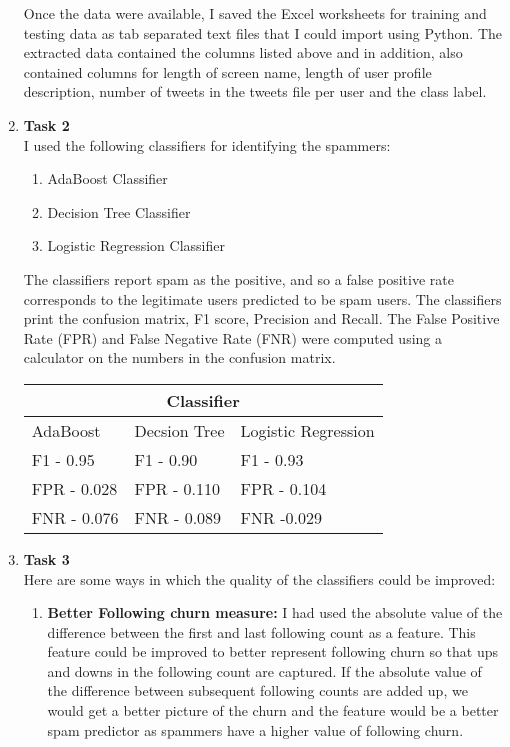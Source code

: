 \documentclass[paper=a4, fontsize=11pt]{scrartcl} %
\numberwithin{equation}{section} %
\numberwithin{figure}{section} %
\numberwithin{table}{section} %
\begin{document}
\begin{enumerate}
Once the data were available, I saved the Excel worksheets for training and testing data as tab separated text files that I could import using Python. The extracted data contained the columns listed above and in addition, also contained columns for length of screen name, length of user profile description, number of tweets in the tweets file per user and the class label.  

\item \textbf{Task 2} \\
I used the following classifiers for identifying the spammers:

\begin{enumerate}

\item AdaBoost Classifier

\item Decision Tree Classifier

\item Logistic Regression Classifier

\end{enumerate}

The classifiers report spam as the positive, and so a false positive rate corresponds to the legitimate users predicted to be spam users. The classifiers print the confusion matrix, F1 score, Precision and Recall. The False Positive Rate (FPR) and False Negative Rate (FNR) were computed using a calculator on the numbers in the confusion matrix.

\begin{tabular}{ 
|p{4cm}|p{4cm}|p{4cm}|  }
 \hline
 \multicolumn{3}{|c|}{Classifier} \\
 \hline
 AdaBoost& Decsion Tree &Logistic Regression\\
 \hline
 F1 - 0.95   & F1 - 0.90    & F1 - 0.93 \\
 FPR -  0.028 &  FPR - 0.110 & FPR - 0.104\\
 FNR - 0.076 &FNR - 0.089 & FNR -0.029\\
 \hline
\end{tabular}

\item \textbf{Task 3}\\
Here are some ways in which the quality of the classifiers could be improved:

\begin{enumerate}

\item \textbf{Better Following churn measure:} I had used the absolute value of the difference between the first and last following count as a feature. This feature could be improved to better represent following churn so that ups and downs in the following count are captured. If the absolute value of the difference between subsequent following counts are added up, we would get a better picture of the churn and the feature would be a better spam predictor as spammers have a higher value of following churn.


\end{enumerate}
\end{enumerate}
\end{document}
